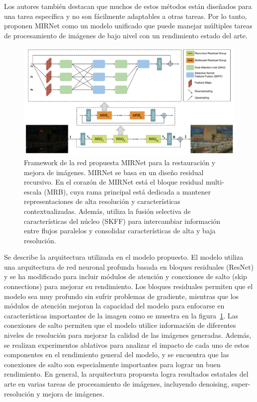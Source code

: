 \documentclass[a4paper,
               ]{jacow}
\begin{document}
Los autores también destacan que muchos de estos métodos están diseñados para una tarea específica y no son fácilmente adaptables a otras tareas. Por lo tanto, proponen MIRNet como un modelo unificado que puede manejar múltiples tareas de procesamiento de imágenes de bajo nivel con un rendimiento estado del arte.

\begin{figure}[!h]
    \centering
    \includegraphics[width=1\textwidth]{arquitectura}
    \caption{Framework de la red propuesta MIRNet para la restauración y mejora de imágenes. MIRNet se basa en un diseño residual recursivo. En el corazón de MIRNet está el bloque residual multi-escala (MRB), cuya rama principal está dedicada a mantener representaciones de alta resolución y características contextualizadas. Además, utiliza la fusión selectiva de características del núcleo (SKFF) para intercambiar información entre flujos paralelos y consolidar características de alta y baja resolución.}
    \label{fig:arquitectura}
\end{figure}
Se describe la arquitectura utilizada en el modelo propuesto. El modelo utiliza una arquitectura de red neuronal profunda basada en bloques residuales (ResNet) y se ha modificado para incluir módulos de atención y conexiones de salto (skip connections) para mejorar su rendimiento. Los bloques residuales permiten que el modelo sea muy profundo sin sufrir problemas de gradiente, mientras que los módulos de atención mejoran la capacidad del modelo para enfocarse en características importantes de la imagen como se muestra en la figura~\ref{fig:arquitectura}. Las conexiones de salto permiten que el modelo utilice información de diferentes niveles de resolución para mejorar la calidad de las imágenes generadas. Además, se realizan experimentos ablativos para analizar el impacto de cada uno de estos componentes en el rendimiento general del modelo, y se encuentra que las conexiones de salto son especialmente importantes para lograr un buen rendimiento. En general, la arquitectura propuesta logra resultados estatales del arte en varias tareas de procesamiento de imágenes, incluyendo denoising, super-resolución y mejora de imágenes.
\end{document}
